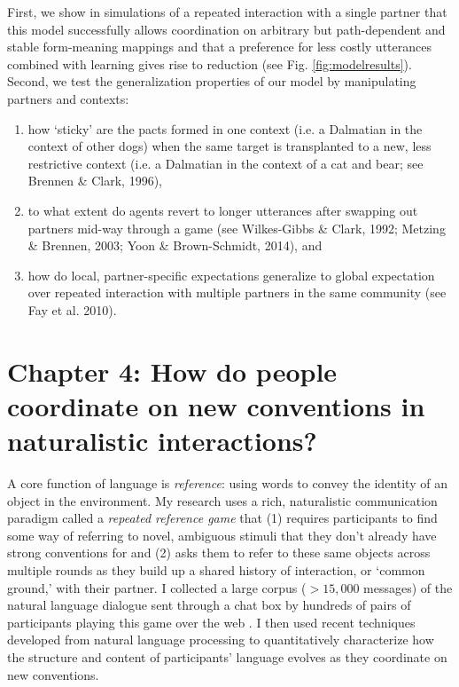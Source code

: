 \documentclass[11pt]{article}
\begin{document}
First, we show in simulations of a repeated interaction with a single partner that this model successfully allows coordination on arbitrary but path-dependent and stable form-meaning mappings and that a preference for less costly utterances combined with learning gives rise to reduction (see Fig. \ref{fig:modelresults}). Second, we test the generalization properties of our model by manipulating partners and contexts: 
\begin{enumerate}
\item how `sticky' are the pacts formed in one context (i.e. a Dalmatian in the context of other dogs) when the same target is transplanted to a new, less restrictive context (i.e. a Dalmatian in the context of a cat and bear; see Brennen \& Clark, 1996), 
\item to what extent do agents revert to longer utterances after swapping out partners mid-way through a game (see  Wilkes-Gibbs \& Clark, 1992; Metzing \& Brennen, 2003; Yoon \& Brown-Schmidt, 2014), and 
\item how do local, partner-specific expectations generalize to global expectation over repeated interaction with multiple partners in the same community (see Fay et al. 2010).
\end{enumerate}



\section{Chapter 4: How do people coordinate on new conventions in naturalistic interactions?}

A core function of language is \emph{reference}: using words to convey the identity of an object in the environment. 
My research uses a rich, naturalistic communication paradigm called a \emph{repeated reference game} that (1) requires participants to find some way of referring to novel, ambiguous stimuli that they don't already have strong conventions for and (2) asks them to refer to these same objects across multiple rounds as they build up a shared history of interaction, or `common ground,' with their partner.
I collected a large corpus ($> 15,000$ messages) of the natural language dialogue sent through a chat box by hundreds of pairs of participants playing this game over the web \cite{hawkins_convention-formation_2017}.
I then used recent techniques developed from natural language processing to quantitatively characterize how the structure and content of participants' language evolves as they coordinate on new conventions.
\end{document}
